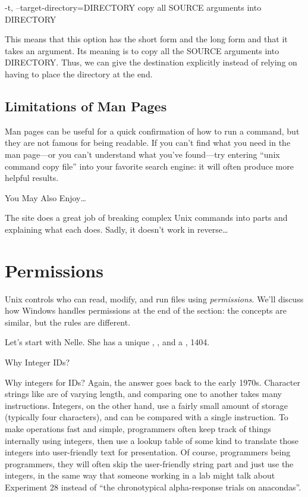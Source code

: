 \begin{VerbOut}
-t, --target-directory=DIRECTORY
     copy all SOURCE arguments into DIRECTORY
\end{VerbOut}

This means that this option has the short form  and the long
form  and that it takes an argument. Its
meaning is to copy all the SOURCE arguments into DIRECTORY. Thus, we can
give the destination explicitly instead of relying on having to place
the directory at the end.

\subsection*{Limitations of Man Pages}

Man pages can be useful for a quick confirmation of how to run a
command, but they are not famous for being readable. If you can't find
what you need in the man page---or you can't understand what you've
found---try entering ``unix command copy file'' into your favorite
search engine: it will often produce more helpful results.

\begin{swcbox}{You May Also Enjoy\ldots{}}

The  site does a great
job of breaking complex Unix commands into parts and explaining what
each does. Sadly, it doesn't work in reverse\ldots{}

\end{swcbox}

\section{Permissions}

Unix controls who can read, modify, and run files using
\emph{permissions}. We'll discuss how Windows handles permissions at the
end of the section: the concepts are similar, but the rules are
different.

Let's start with Nelle. She has a unique , , and a , 1404.

\begin{swcbox}{Why Integer IDs?}

Why integers for IDs? Again, the answer goes back to the early 1970s.
Character strings like  are of varying length, and
comparing one to another takes many instructions. Integers, on the other
hand, use a fairly small amount of storage (typically four characters),
and can be compared with a single instruction. To make operations fast
and simple, programmers often keep track of things internally using
integers, then use a lookup table of some kind to translate those
integers into user-friendly text for presentation. Of course,
programmers being programmers, they will often skip the user-friendly
string part and just use the integers, in the same way that someone
working in a lab might talk about Experiment 28 instead of ``the
chronotypical alpha-response trials on anacondas''.

\end{swcbox}

